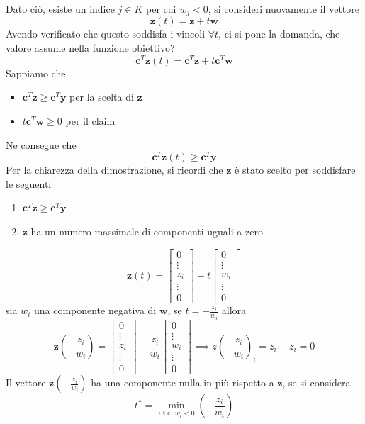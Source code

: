 \documentclass[10pt, letterpaper]{report}
\begin{document}
Dato ciò, esiste un indice $j\in K$ per cui $w_j<0$, si consideri nuovamente il vettore $$\mathbf z(t)=\mathbf{z}+t\mathbf w$$
Avendo verificato che questo soddisfa i vincoli $\forall t$, ci si pone la domanda, che valore assume nella funzione obiettivo? 
$$ \mathbf c^T \mathbf z(t)=\mathbf c^T\mathbf z+t\mathbf c^T\mathbf w$$
Sappiamo che\begin{itemize}
    \item $\mathbf c^T\mathbf z\ge \mathbf c^T\mathbf y$ per la scelta di $\mathbf z$
    \item $t\mathbf c^T\mathbf w\ge 0$ per il claim
\end{itemize}
Ne consegue che $$ \mathbf c^T \mathbf z(t)\ge \mathbf c^T \mathbf y$$
Per la chiarezza della dimostrazione, si ricordi che $\mathbf z$ è stato scelto per soddisfare le seguenti \begin{enumerate}
    \item $\mathbf  c^T\mathbf z\ge \mathbf  c^T\mathbf y$
    \item $\mathbf z$ ha un numero massimale di componenti uguali a zero
\end{enumerate}
$$ 
\mathbf z(t)=\begin{bmatrix}
    0\\\vdots \\ z_i\\ \vdots \\0
\end{bmatrix}+t\begin{bmatrix}
    0\\\vdots \\ w_i\\ \vdots \\0
\end{bmatrix}
$$
sia $ w_i$ una componente negativa di $\mathbf w$, se $t=-\frac{z_i}{w_i}$ allora 
$$ 
\mathbf z(-\frac{z_i}{w_i})=\begin{bmatrix}
    0\\\vdots \\ z_i\\ \vdots \\0
\end{bmatrix}-\frac{z_i}{w_i}\begin{bmatrix}
    0\\\vdots \\ w_i\\ \vdots \\0
\end{bmatrix}\implies z(-\frac{z_i}{w_i})_i=z_i-z_i=0
$$
Il vettore $\mathbf z(-\frac{z_i}{w_i})$ ha una componente  nulla in più rispetto a $\mathbf z$, se si considera $$ t^*=\min_{i \text{ t.c. }w_i<0}(-\frac{z_i}{w_i})$$
\end{document}
